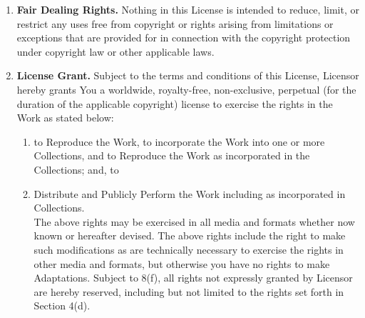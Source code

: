 \begin{enumerate}
  \item {\textbf{Fair Dealing Rights.} Nothing in this License is intended to
  reduce, limit, or restrict any uses free from copyright or rights arising from
  limitations or exceptions that are provided for in connection with the
  copyright protection under copyright law or other applicable laws.}

  \item {\textbf{License Grant.} Subject to the terms and conditions of this
  License, Licensor hereby grants You a worldwide, royalty-free, non-exclusive,
  perpetual (for the duration of the applicable copyright) license to exercise
  the rights in the Work as stated below:}
  \begin{enumerate}
    \item {to Reproduce the Work, to incorporate the Work into one or more
    Collections, and to Reproduce the Work as incorporated in the Collections;
    and, to}
    \item {Distribute and Publicly Perform the Work including as incorporated in
    Collections.} 
    \\
The above rights may be exercised in all media and formats whether now known or
hereafter devised. The above rights include the right to make such modifications
as are technically necessary to exercise the rights in other media and formats,
but otherwise you have no rights to make Adaptations. Subject to 8(f), all
rights not expressly granted by Licensor are hereby reserved, including but not
limited to the rights set forth in Section 4(d).
  \end {enumerate}


\end{enumerate}
